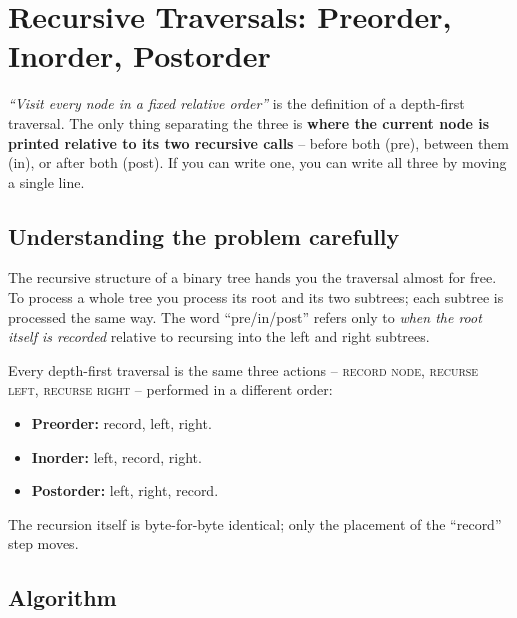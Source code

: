 \section{Recursive Traversals: Preorder, Inorder, Postorder}
\label{sec:trees-rec-traversals}


\begin{patternbox}
\emph{``Visit every node in a fixed relative order''} is the definition of
a depth-first traversal. The only thing separating the three is
\textbf{where the current node is printed relative to its two recursive
calls} -- before both (pre), between them (in), or after both (post). If
you can write one, you can write all three by moving a single line.
\end{patternbox}

\subsection*{Understanding the problem carefully}

The recursive structure of a binary tree hands you the traversal almost
for free. To process a whole tree you process its root and its two
subtrees; each subtree is processed the same way. The word
``pre/in/post'' refers only to \emph{when the root itself is recorded}
relative to recursing into the left and right subtrees.

\begin{ideabox}
Every depth-first traversal is the same three actions -- \textsc{record
node}, \textsc{recurse left}, \textsc{recurse right} -- performed in a
different order:
\begin{itemize}
  \item \textbf{Preorder:} record, left, right.
  \item \textbf{Inorder:} left, record, right.
  \item \textbf{Postorder:} left, right, record.
\end{itemize}
The recursion itself is byte-for-byte identical; only the placement of the
``record'' step moves.
\end{ideabox}

\subsection*{Algorithm}

